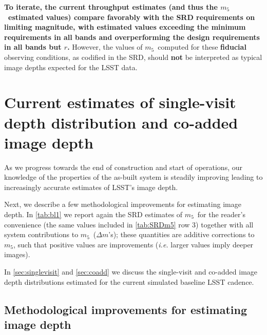 \documentclass[PST,authoryear,toc]{lsstdoc}
\newcommand{\cm}{\ensuremath{C_m}}
\newcommand{\mf}{\ensuremath{m_5}}
\begin{document}
{\bf To iterate, the current throughput estimates (and thus the \mf\ estimated values) compare favorably with the SRD requirements on limiting magnitude, with estimated values exceeding the minimum requirements in all bands and overperforming the design requirements in all bands but $r$.} However,
the values of \mf\ computed for these {\bf fiducial} observing conditions, as codified in the SRD,
should {\bf not} be interpreted as typical image depths expected for the LSST data. 





\section{Current estimates of single-visit depth distribution and co-added image depth} \label{sec:cadence}
As we progress towards the end of construction and start of operations, our knowledge of the properties of the as-built system is steadily improving leading to increasingly accurate estimates of LSST's image depth.

Next, we describe a few methodological improvements for estimating image depth. In \autoref{tab:bl1} we report again the SRD estimates of \mf\ for the reader's convenience (the same values included in \autoref{tab:SRDm5} row 3) together with all system contributions to \mf\ ($\Delta m$'s); these quantities are additive corrections to \mf, such that positive values are improvements ({\it i.e.} larger values imply deeper images). %

In \autoref{sec:singlevisit} and \autoref{sec:coadd} we discuss the 
single-visit and co-added image depth distributions estimated for the current simulated baseline LSST cadence. 


\subsection{Methodological improvements for estimating image depth}\label{sec:estdepth}
\end{document}
